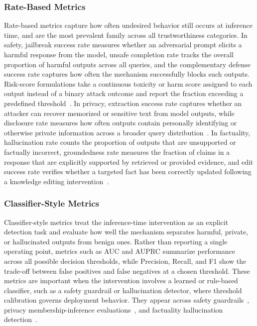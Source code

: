 \subsubsection{Rate-Based Metrics}
Rate-based metrics capture how often undesired behavior still occurs at inference time, and are the most prevalent family across all trustworthiness categories. In safety, jailbreak success rate measures whether an adversarial prompt elicits a harmful response from the model, unsafe completion rate tracks the overall proportion of harmful outputs across all queries, and the complementary defense success rate captures how often the mechanism successfully blocks such outputs. Risk-score formulations take a continuous toxicity or harm score assigned to each output instead of a binary attack outcome and report the fraction exceeding a predefined threshold~\citep{kumar2024certifying, Xu2024SafeDecodingDA, Huang2024SafeAlignerSA, chen2025safeptr, deng2025guard, hasan2024pruning, fan2025peerguarddefendingmultiagentsystems, yan2025dual}. In privacy, extraction success rate captures whether an attacker can recover memorized or sensitive text from model outputs, while disclosure rate measures how often outputs contain personally identifying or otherwise private information across a broader query distribution~\citep{pawelczyk2023context, Borec2024TheUI, Wang2025PrivacyAwareDM, zou2025poisonedrag}. In factuality, hallucination rate counts the proportion of outputs that are unsupported or factually incorrect, groundedness rate measures the fraction of claims in a response that are explicitly supported by retrieved or provided evidence, and edit success rate verifies whether a targeted fact has been correctly updated following a knowledge editing intervention~\citep{dhuliawala2024chain, asai2024self, zhou2024metacognitive, meng2022locating, meng2022memit}.

\subsubsection{Classifier-Style Metrics}
Classifier-style metrics treat the inference-time intervention as an explicit detection task and evaluate how well the mechanism separates harmful, private, or hallucinated outputs from benign ones. Rather than reporting a single operating point, metrics such as AUC and AUPRC summarize performance across all possible decision thresholds, while Precision, Recall, and F1 show the trade-off between false positives and false negatives at a chosen threshold. These metrics are important when the intervention involves a learned or rule-based classifier, such as a safety guardrail or hallucination detector, where threshold calibration governs deployment behavior. They appear across safety guardrails~\citep{Padhi2024GraniteG, Chi2024LlamaG3, Kumar2025PolyGuardAM, Liu2025GuardReasonerTR}, privacy membership-inference evaluations~\citep{zou2025poisonedrag, nakka2025piijailbreaking}, and factuality hallucination detection~\citep{asai2024self, zhou2024metacognitive}.

